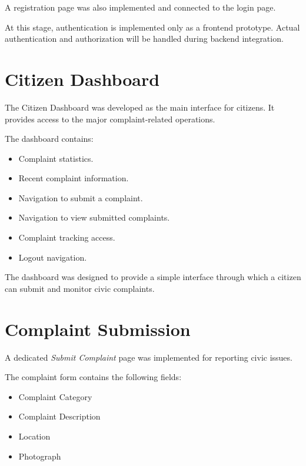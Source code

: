 \documentclass[12pt,a4paper]{article}
\begin{document}
A registration page was also implemented and connected to the login page.

At this stage, authentication is implemented only as a frontend prototype.
Actual authentication and authorization will be handled during backend
integration.

\section{Citizen Dashboard}

The Citizen Dashboard was developed as the main interface for citizens.
It provides access to the major complaint-related operations.

The dashboard contains:

\begin{itemize}
    \item Complaint statistics.
    \item Recent complaint information.
    \item Navigation to submit a complaint.
    \item Navigation to view submitted complaints.
    \item Complaint tracking access.
    \item Logout navigation.
\end{itemize}

The dashboard was designed to provide a simple interface through which a
citizen can submit and monitor civic complaints.

\section{Complaint Submission}

A dedicated \textit{Submit Complaint} page was implemented for reporting
civic issues.

The complaint form contains the following fields:

\begin{itemize}
    \item Complaint Category
    \item Complaint Description
    \item Location
    \item Photograph
\end{itemize}
\end{document}
